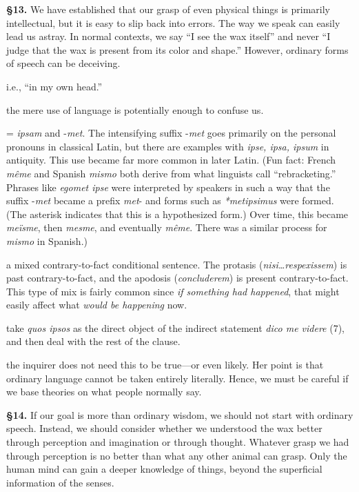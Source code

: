 \prenotes

\textbf{§13.} We have established that our grasp of even physical things is primarily intellectual, but it is easy to slip back into errors. The way we speak can easily lead us astray. In normal contexts, we say ``I see the wax itself'' and never ``I judge that the wax is present from its color and shape.'' However, ordinary forms of speech can be deceiving.

 i.e., ``in my own head.''

 the mere use of language is potentially enough to confuse us.

 = \textit{ipsam} and -\textit{met}. The intensifying suffix -\textit{met} goes primarily on the personal pronouns in classical Latin, but there are examples with \textit{ipse, ipsa, ipsum} in antiquity. This use became far more common in later Latin. (Fun fact: French \textit{même} and Spanish \textit{mismo} both derive from what linguists call ``rebracketing.'' Phrases like \textit{egomet ipse} were interpreted by speakers in such a way that the suffix -\textit{met} became a prefix \textit{met}- and forms such as \textit{*metipsimus} were formed. (The asterisk indicates that this is a hypothesized form.) Over time, this became \textit{meïsme}, then \textit{mesme}, and eventually \textit{même}. There was a similar process for \textit{mismo} in Spanish.)

 a mixed contrary-to-fact conditional sentence. The protasis (\textit{nisi\dots respexissem}) is past contrary-to-fact, and the apodosis (\textit{concluderem}) is present contrary-to-fact. This type of mix is fairly common since \textit{if something had happened}, that might easily affect what \textit{would be happening} now.

 take \textit{quos ipsos} as the direct object of the indirect statement \textit{dico me videre} (7), and then deal with the rest of the clause.

 the inquirer does not need this to be true---or even likely. Her point is that ordinary language cannot be taken entirely literally. Hence, we must be careful if we base theories on what people normally say.

\textbf{§14.} If our goal is more than ordinary wisdom, we should not start with ordinary speech. Instead, we should consider whether we understood the wax better through perception and imagination or through thought. Whatever grasp we had through perception is no better than what any other animal can grasp. Only the human mind can gain a deeper knowledge of things, beyond the superficial information of the senses.

